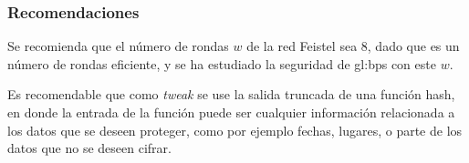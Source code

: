 \subsubsection{Recomendaciones}


Se recomienda que el número de rondas $w$ de la red Feistel sea $8$, dado
que es un número de rondas eficiente, y se ha estudiado la seguridad de
\gls{gl:bps} con este $w$.

Es recomendable que como \textit{tweak} se use la salida truncada de una función
hash, en donde la entrada de la función puede ser cualquier información
relacionada a los datos que se deseen proteger, como por ejemplo fechas, lugares,
o parte de los datos que no se deseen cifrar.
